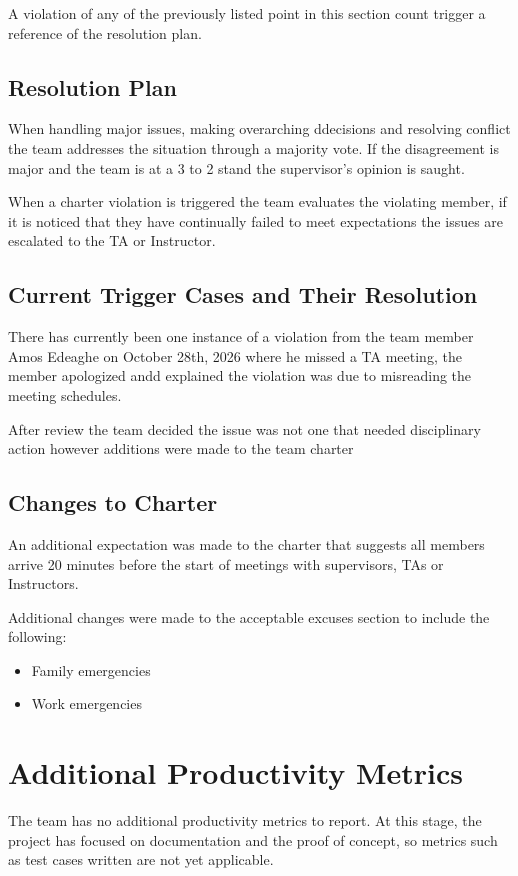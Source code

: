 \documentclass{article}
\begin{document}
A violation of any of the previously listed point in this section count trigger a reference of the resolution plan.

\subsection{Resolution Plan}
 When handling major issues, making overarching ddecisions and resolving conflict the team addresses the situation through a majority vote. 
 If the disagreement is major and the team is at a 3 to 2 stand the supervisor's opinion is saught.

 When a charter violation is triggered the team evaluates the violating member, if it is noticed that they have continually failed to meet expectations the issues are escalated to the
 TA or Instructor.

\subsection{Current Trigger Cases and Their Resolution}

There has currently been one instance of a violation from the team member Amos Edeaghe on October 28th, 2026 where he missed a TA meeting,
the member apologized andd explained the violation was due to misreading the meeting schedules. 

After review the team decided the issue was not one that needed disciplinary action however additions were made to the team charter

\subsection{Changes to Charter}

An additional expectation was made to the charter that suggests all members arrive 20 minutes before the start of meetings with supervisors, TAs or Instructors.

Additional changes were made to the acceptable excuses section to include the following:

\begin{itemize}
\item Family emergencies
\item Work emergencies
\end{itemize}


\section{Additional Productivity Metrics}

The team has no additional productivity metrics to report. At this stage, the project has focused on documentation and the proof of concept, so metrics such as test cases written are not yet applicable.
\end{document}
